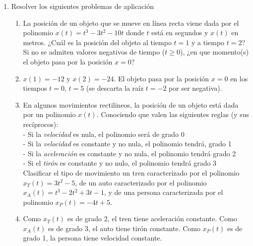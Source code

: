 \documentclass[a4paper]{article}
\newcommand{\answer}{\item[**]}
\newcommand{\exercise}{\item}
\begin{document}
\begin{enumerate}
\begin{enumerate} [label=(\alph*)]
		\item $P(x)$ es de grado 5, tiene coeficientes reales, $P(i)=0$ y $P(1+i)=0$
		\answer Por el teorema de raíces conjugadas y el grado sabemos que $P(x)=a(x-x_1)(x-i)(x+i)(x-1-i)(x-1+i)$. Podemos elegir arbitrariamente $a$ y $x_1$. Por ejemplo, $P(x)=3(x-2)(x-i)(x+i)(x-1-i)(x-1+i)$.

		\item $gr\left(P(x)\right)=6$, $P(x)$ es mónico, tiene coeficientes reales y algunas de sus raíces son $i$ y $1+i$
		\answer Por el teorema de raíces conjugadas y el grado sabemos que $P(x)=(x-x_1)(x-x_2)(x-i)(x+i)(x-1-i)(x-1+i)$. Podemos elegir arbitrariamente $x_1$ y $x_2$. Por ejemplo, $P(x)=(x-7)(x-5)(x-i)(x+i)(x-1-i)(x-1+i)$.

	\end{enumerate}


	\exercise Resolver los siguientes problemas de aplicación
	\begin{enumerate} [label=(\alph*)]
		
		\item La posición de un objeto que se mueve en línea recta viene dada por el polinomio $x(t) = t^3 - 3t^2 -10t$ donde $t$ está en segundos y $x(t)$ en metros. ¿Cuál es la posición del objeto al tiempo $t=1$ y a tiempo $t=2$? Si no se admiten valores negativos de tiempo ($t \geq 0$), ¿en que momento(s) el objeto pasa por la posición $x=0$?
		\answer $x(1)=-12$ y $x(2)=-24$. El objeto pasa por la posición $x=0$ en los tiempos $t=0$, $t=5$ (se descarta la raíz $t=-2$ por ser negativa). 

		\item En algunos movimientos rectilineos, la posición de un objeto está dada por un polinomio $x(t)$. Conociendo que valen las siguientes reglas (y sus recíprocos): \\ - Si la \textit{velocidad} es nula, el polinomio será de grado 0 \\ - Si la \textit{velocidad} es constante y no nula, el polinomio tendrá, grado 1 \\ - Si la \textit{aceleración} es constante y no nula, el polinomio tendrá grado 2 \\ - Si el \textit{tirón} es constante y no nulo, el polinomio tendrá grado 3 \\ Clasificar el tipo de movimiento un tren caracterizado por el polinomio $x_T(t)=3t^2-5$, de un auto caracterizado por el polinomio $x_A(t)=t^3-2t^2+3t-1$, y de una persona caracterizada por el polinomio $x_P(t)=-4t+5$.
		\answer Como $x_T(t)$ es de grado 2, el tren tiene aceleración constante. Como $x_A(t)$ es de grado 3, el auto tiene tirón constante. Como $x_P(t)$ es de grado 1, la persona tiene velocidad constante.


\end{enumerate}
\end{enumerate}
\end{document}
